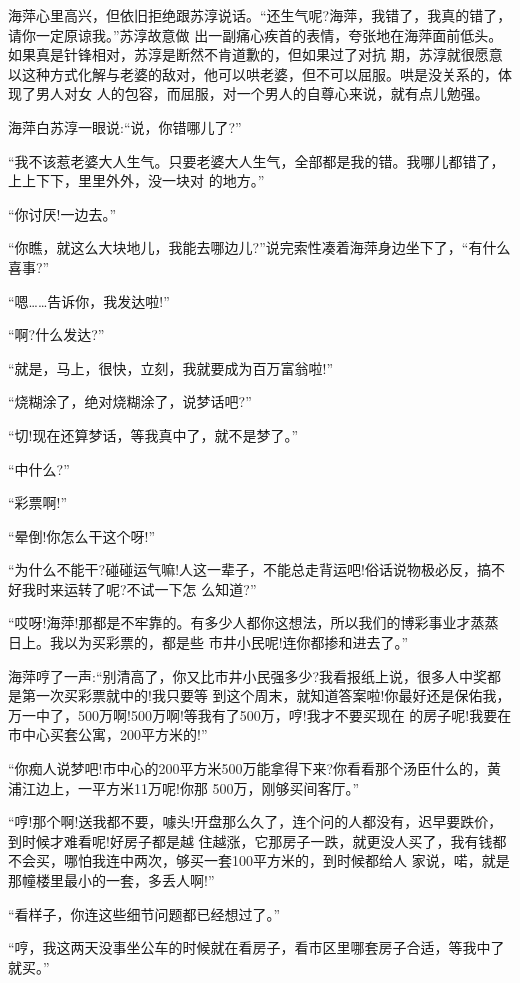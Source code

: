 \documentclass[11pt,a4paper,onecolumn]{article}
\begin{document}
海萍心里高兴，但依旧拒绝跟苏淳说话。``还生气呢?海萍，我错了，我真的错了，请你一定原谅我。''苏淳故意做
出一副痛心疾首的表情，夸张地在海萍面前低头。如果真是针锋相对，苏淳是断然不肯道歉的，但如果过了对抗
期，苏淳就很愿意以这种方式化解与老婆的敌对，他可以哄老婆，但不可以屈服。哄是没关系的，体现了男人对女
人的包容，而屈服，对一个男人的自尊心来说，就有点儿勉强。

海萍白苏淳一眼说:``说，你错哪儿了?''

``我不该惹老婆大人生气。只要老婆大人生气，全部都是我的错。我哪儿都错了，上上下下，里里外外，没一块对
的地方。''

``你讨厌!一边去。''

``你瞧，就这么大块地儿，我能去哪边儿?''说完索性凑着海萍身边坐下了，``有什么喜事?''

``嗯……告诉你，我发达啦!''

``啊?什么发达?''

``就是，马上，很快，立刻，我就要成为百万富翁啦!''

``烧糊涂了，绝对烧糊涂了，说梦话吧?''

``切!现在还算梦话，等我真中了，就不是梦了。''

``中什么?''

``彩票啊!''

``晕倒!你怎么干这个呀!''

``为什么不能干?碰碰运气嘛!人这一辈子，不能总走背运吧!俗话说物极必反，搞不好我时来运转了呢?不试一下怎
么知道?''

``哎呀!海萍!那都是不牢靠的。有多少人都你这想法，所以我们的博彩事业才蒸蒸日上。我以为买彩票的，都是些
市井小民呢!连你都掺和进去了。''

海萍哼了一声:``别清高了，你又比市井小民强多少?我看报纸上说，很多人中奖都是第一次买彩票就中的!我只要等
到这个周末，就知道答案啦!你最好还是保佑我，万一中了，500万啊!500万啊!等我有了500万，哼!我才不要买现在
的房子呢!我要在市中心买套公寓，200平方米的!''

``你痴人说梦吧!市中心的200平方米500万能拿得下来?你看看那个汤臣什么的，黄浦江边上，一平方米11万呢!你那
500万，刚够买间客厅。''

``哼!那个啊!送我都不要，噱头!开盘那么久了，连个问的人都没有，迟早要跌价，到时候才难看呢!好房子都是越
住越涨，它那房子一跌，就更没人买了，我有钱都不会买，哪怕我连中两次，够买一套100平方米的，到时候都给人
家说，喏，就是那幢楼里最小的一套，多丢人啊!''

``看样子，你连这些细节问题都已经想过了。''

``哼，我这两天没事坐公车的时候就在看房子，看市区里哪套房子合适，等我中了就买。''
\end{document}
